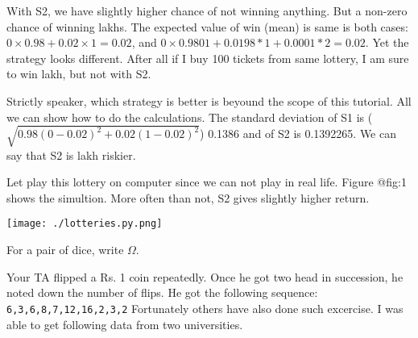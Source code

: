 \documentclass[a4paper,9pt, addpoints, solutions]{exam}
\begin{document}
\begin{questions}
\begin{solution}
    With S2, we have slightly higher chance of not winning anything. But a non-zero
    chance of winning  lakhs. The expected value of win (mean) is same is
    both cases: $0 \times 0.98 + 0.02 \times 1 = 0.02$, and $0\times 0.9801 + 0.0198
    * 1 + 0.0001 * 2 = 0.02$. Yet the strategy looks different. After all if I buy
    100 tickets from same lottery, I am sure to win  lakh, but not with S2.

    Strictly speaker, which strategy is better is beyound the scope of this
    tutorial. All we can show how to do the calculations.  The standard deviation of
    S1 is ($\sqrt{0.98(0-0.02)^2+0.02(1-0.02)^2}$) 0.1386 and of S2 is
    0.1392265. We can say that S2 is  lakh riskier.

    Let play this lottery on computer since we can not play in real life.
    Figure @fig:1 shows the simultion. More often than not, S2 gives slightly
    higher return.

        \texttt{[image: ./lotteries.py.png]}
        \label{fig:lottery}
\end{solution}

\question For a pair of dice, write $\Omega$.

\question[5]
Your TA flipped a Rs. 1 coin repeatedly. Once he got two head in succession,
he noted down the number of flips. He got the following sequence:
\verb|6,3,6,8,7,12,16,2,3,2| 
Fortunately others have also done such excercise. I was able to get following
data from two universities.


\end{questions}
\end{document}
